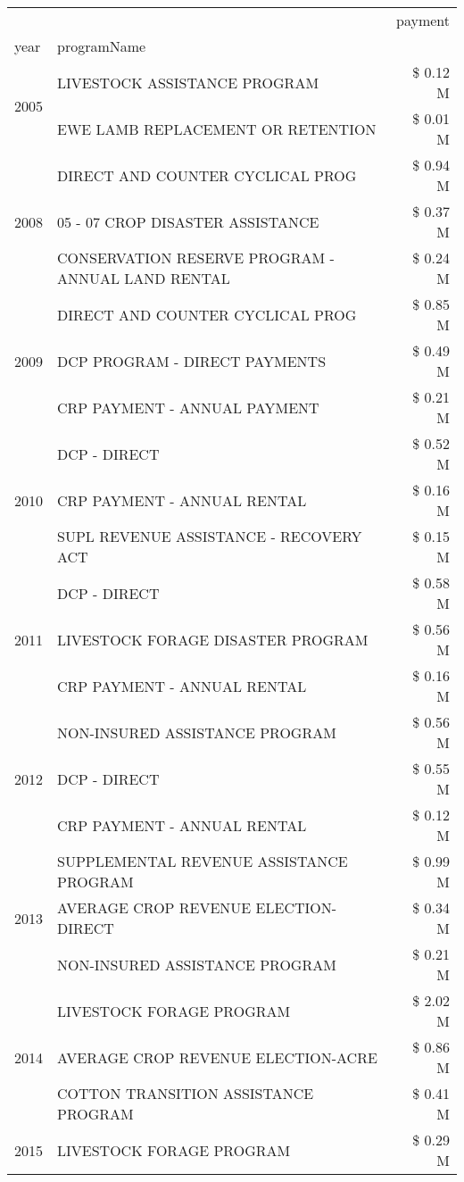 \begin{tabular}{llr}
\toprule
 &  & payment \\
year & programName &  \\
\midrule
\multirow[t]{2}{*}{2005} & LIVESTOCK ASSISTANCE PROGRAM & \$ 0.12 M \\
 & EWE LAMB REPLACEMENT OR RETENTION & \$ 0.01 M \\
\cline{1-3}
\multirow[t]{3}{*}{2008} & DIRECT AND COUNTER CYCLICAL PROG & \$ 0.94 M \\
 & 05 - 07 CROP DISASTER ASSISTANCE & \$ 0.37 M \\
 & CONSERVATION RESERVE PROGRAM - ANNUAL LAND RENTAL & \$ 0.24 M \\
\cline{1-3}
\multirow[t]{3}{*}{2009} & DIRECT AND COUNTER CYCLICAL PROG & \$ 0.85 M \\
 & DCP PROGRAM - DIRECT PAYMENTS & \$ 0.49 M \\
 & CRP PAYMENT - ANNUAL PAYMENT & \$ 0.21 M \\
\cline{1-3}
\multirow[t]{3}{*}{2010} & DCP - DIRECT & \$ 0.52 M \\
 & CRP PAYMENT - ANNUAL RENTAL & \$ 0.16 M \\
 & SUPL REVENUE ASSISTANCE - RECOVERY ACT & \$ 0.15 M \\
\cline{1-3}
\multirow[t]{3}{*}{2011} & DCP - DIRECT & \$ 0.58 M \\
 & LIVESTOCK FORAGE DISASTER PROGRAM & \$ 0.56 M \\
 & CRP PAYMENT - ANNUAL RENTAL & \$ 0.16 M \\
\cline{1-3}
\multirow[t]{3}{*}{2012} & NON-INSURED ASSISTANCE PROGRAM & \$ 0.56 M \\
 & DCP - DIRECT & \$ 0.55 M \\
 & CRP PAYMENT - ANNUAL RENTAL & \$ 0.12 M \\
\cline{1-3}
\multirow[t]{3}{*}{2013} & SUPPLEMENTAL REVENUE ASSISTANCE PROGRAM & \$ 0.99 M \\
 & AVERAGE CROP REVENUE ELECTION-DIRECT & \$ 0.34 M \\
 & NON-INSURED ASSISTANCE PROGRAM & \$ 0.21 M \\
\cline{1-3}
\multirow[t]{3}{*}{2014} & LIVESTOCK FORAGE PROGRAM & \$ 2.02 M \\
 & AVERAGE CROP REVENUE ELECTION-ACRE & \$ 0.86 M \\
 & COTTON TRANSITION ASSISTANCE PROGRAM & \$ 0.41 M \\
\cline{1-3}
\multirow[t]{3}{*}{2015} & LIVESTOCK FORAGE PROGRAM & \$ 0.29 M \\

\end{tabular}
